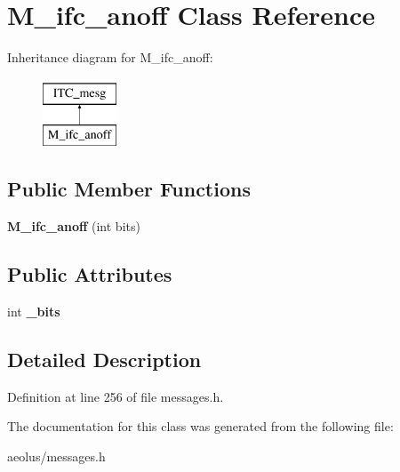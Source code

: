 \hypertarget{class_m__ifc__anoff}{}\section{M\+\_\+ifc\+\_\+anoff Class Reference}
\label{class_m__ifc__anoff}
Inheritance diagram for M\+\_\+ifc\+\_\+anoff\+:\begin{figure}[H]
\begin{center}
\leavevmode
\includegraphics[height=2.000000cm]{class_m__ifc__anoff}
\end{center}
\end{figure}
\subsection*{Public Member Functions}
\begin{DoxyCompactItemize}
\item 
\mbox{\label{class_m__ifc__anoff_ac83b636a634d8b9570ad7b3a5d557e5a}} 
{\bfseries M\+\_\+ifc\+\_\+anoff} (int bits)
\end{DoxyCompactItemize}
\subsection*{Public Attributes}
\begin{DoxyCompactItemize}
\item 
\mbox{\label{class_m__ifc__anoff_adf5b84476e2280f104e7322757011cf8}} 
int {\bfseries \+\_\+bits}
\end{DoxyCompactItemize}


\subsection{Detailed Description}


Definition at line 256 of file messages.\+h.



The documentation for this class was generated from the following file\+:\begin{DoxyCompactItemize}
\item 
aeolus/messages.\+h\end{DoxyCompactItemize}
